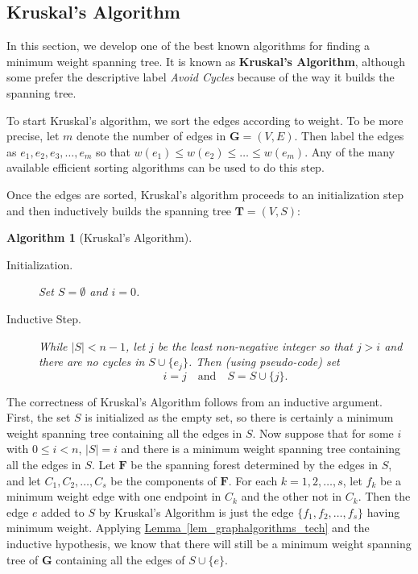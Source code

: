 \documentclass[10pt,]{book}
\newcommand{\terminology}[1]{\textbf{#1}}
\theoremstyle{plain}
\newtheorem{algorithm}[theorem]{Algorithm}
\theoremstyle{definition}
\theoremstyle{definition}
\theoremstyle{definition}
\theoremstyle{definition}
\numberwithin{equation}{section}
\newcommand{\GVE}{\mathbf{G}=(V,E)}
\newcommand{\bfG}{\mathbf{G}}
\newcommand{\bfF}{\mathbf{F}}
\newcommand{\bfT}{\mathbf{T}}
\newcommand{\lt}{<}
\begin{document}
\subsection[{Kruskal's Algorithm}]{Kruskal's Algorithm}\label{subsection-20}
\hypertarget{p-177}{}%
In this section, we develop one of the best known algorithms for finding a minimum weight spanning tree. It is known as \terminology{Kruskal's Algorithm}, although some prefer the descriptive label \emph{Avoid Cycles} because of the way it builds the spanning tree.%
\par
\hypertarget{p-178}{}%
To start Kruskal's algorithm, we sort the edges according to weight.  To be more precise, let \(m\) denote the number of edges in \(\GVE\).  Then label the edges as \(e_1,e_2,e_3,\dots,e_m\) so that \(w(e_1)\le w(e_2)\le \dots \le w(e_m)\). Any of the many available efficient sorting algorithms can be used to do this step.%
\par
\hypertarget{p-179}{}%
Once the edges are sorted, Kruskal's algorithm proceeds to an initialization step and then inductively builds the spanning tree \(\bfT=(V,S)\):%
\begin{algorithm}[{Kruskal's Algorithm}]\label{alg_kruskal}
\hypertarget{p-180}{}%
\leavevmode%
\begin{description}
\item[{Initialization.}]\hypertarget{li-43}{}\hypertarget{p-181}{}%
Set \(S=\emptyset\) and \(i=0\).%
\item[{Inductive Step.}]\hypertarget{li-44}{}\hypertarget{p-182}{}%
While \(|S| \lt n-1\), let \(j\) be the least non-negative integer so that \(j > i\) and there are no cycles in \(S\cup\{e_j\}\). Then (using pseudo-code) set%
\begin{equation*}
i = j\quad\text{and} \quad S= S\cup\{j\}.
\end{equation*}
%
\end{description}
%
\end{algorithm}
\hypertarget{p-183}{}%
The correctness of Kruskal's Algorithm follows from an inductive argument. First, the set \(S\) is initialized as the empty set, so there is certainly a minimum weight spanning tree containing all the edges in \(S\). Now suppose that for some \(i\) with \(0\le i \lt n\), \(|S|=i\) and there is a minimum weight spanning tree containing all the edges in \(S\). Let \(\bfF\) be the spanning forest determined by the edges in \(S\), and let \(C_1, C_2,\dots,C_s\) be the components of \(\bfF\). For each \(k=1,2,\dots,s\), let \(f_k\) be a minimum weight edge with one endpoint in \(C_k\) and the other not in \(C_k\). Then the edge \(e\) added to \(S\) by Kruskal's Algorithm is just the edge \(\{f_1,f_2,\dots,f_s\}\) having minimum weight. Applying \hyperref[lem_graphalgorithms_tech]{Lemma~\ref{lem_graphalgorithms_tech}} and the inductive hypothesis, we know that there will still be a minimum weight spanning tree of \(\bfG\) containing all the edges of \(S\cup\{e\}\).%
\end{document}
